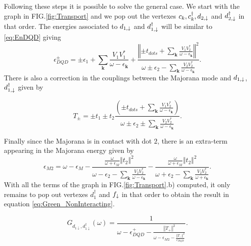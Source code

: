 \documentclass[showpacs,aps,prb,reprint,superscriptaddress]{revtex4-1}
\begin{document}
Following these steps it is possible to solve the general case.  We start with the graph in FIG.\ref{fig:Transport} and we pop out the vertexes $c_k,c^\dagger_k, d_{2,\downarrow}$ and $ d^\dagger_{2,\downarrow}$ in that order. The energies associated to $d_{1,\downarrow}$ and $d^\dagger_{1,\downarrow}$ will be similar to \eqref{eq:EnDQD} giving 
\begin{equation}
    \epsilon_{DQD}^{\pm}=\pm\epsilon_{1}+\sum_{\mathbf{k}}\frac{V_{1}V_{1}^{*}}{\omega-\epsilon_{\mathbf{k}}}+\frac{\left\Vert \pm t_{dots}+\sum_{\mathbf{k}}\frac{V_{1}V_{2}^{*}}{\omega-\epsilon_{\mathbf{k}}}\right\Vert ^{2}}{\omega\pm\epsilon_{2}-\sum_{\mathbf{k}}\frac{V_{2}V_{2}^{*}}{\omega-\epsilon_{\mathbf{k}}}}. \label{eq:epDQD}
\end{equation}
\noindent There is also a correction in the couplings between the Majorana mode and $d_{1,\downarrow}$, $d^\dagger_{1,\downarrow}$ given by 

\begin{equation}
    T_{\pm}=\pm t_{1}\pm t_{2}\frac{\left(\pm t_{dots}+\sum_{\mathbf{k}}\frac{V_{1}V_{2}^{*}}{\omega-\epsilon_{\mathbf{k}}}\right)}{\omega\pm\epsilon_{2}\pm\sum_{\mathbf{k}}\frac{V_{2}V_{2}^{*}}{\omega-\epsilon_{\mathbf{k}}}}. \label{eq:T+-}
\end{equation}

Finally since the Majorana is in contact with dot $2$, there is an extra-term appearing in the  Majorana energy given by 
\begin{equation}
    \epsilon_{M2}=\omega-\epsilon_{M}-\frac{\frac{\omega}{\omega+\epsilon_{M}}\left\Vert t_{2}\right\Vert ^{2} } {\omega-\epsilon_{2}-\sum_{\mathbf{k}}\frac{V_{2}V_{2}^{*}}{\omega-\epsilon_{\mathbf{k}}}}-\frac{\frac{\omega}{\omega+\epsilon_{M}}\left\Vert t_{2}\right\Vert ^{2}}{\omega+\epsilon_{2}-\sum_{\mathbf{k}}\frac{V_{2}V_{2}^{*}}{\omega+\epsilon_{\mathbf{k}}}}. \label{eq:M2}
\end{equation}
With all the terms of the graph in FIG.\ref{fig:Transport}.b) computed, it only remains to pop out vertexes $d^\dagger_1$ and $f_\downarrow$ in that order to obtain the result in equation \eqref{eq:Green_NonInteracting}. 


\begin{equation}
    G_{{d_{1\downarrow},d_{1\downarrow}^{\dagger}}}\left(\omega\right)=\frac{1}{\omega-\epsilon_{DQD}^{+}-\frac{\left\Vert T_{+}\right\Vert ^{2}}{\omega-\epsilon_{M2}-\frac{\left\Vert T_{-}\right\Vert ^{2}}{\epsilon_{DQD}^{-}}}}.
\end{equation}
\end{document}
